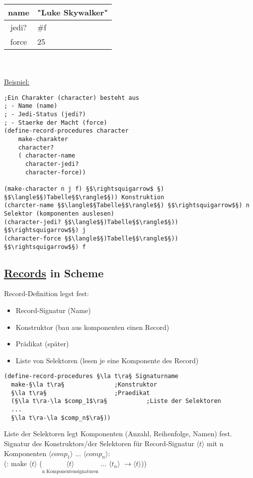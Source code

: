 \documentclass[a4paper,12pt]{article}
\newcommand{\la}{$\langle$}
\newcommand{\ra}{$\rangle$}
\begin{document}
\begin{tabular}{|c|l|}
\hline
name & "Luke Skywalker"\\
\hline
jedi? & \#f\\
\hline
force & 25\\
\hline
\end{tabular}
\\\\
\uline{Beispiel:}
\begin{lstlisting}[style=customc]
;Ein Charakter (character) besteht aus
; - Name (name)
; - Jedi-Status (jedi?)
; - Staerke der Macht (force)
(define-record-procedures character
	make-charakter
	character?
	( character-name
	  character-jedi?
	  character-force))
	  
(make-character n j f) §$\rightsquigarrow$ §) §$\langle$§)Tabelle§$\rangle$§)) Konstruktion
(charcter-name §$\langle$§Tabelle§$\rangle$§) §$\rightsquigarrow$§) n Selektor (komponenten auslesen)
(character-jedi? §$\langle$§)Tabelle§$\rangle$§)) §$\rightsquigarrow$§) j
(character-force §$\langle$§)Tabelle§$\rangle$§)) §$\rightsquigarrow$§) f
\end{lstlisting}
\subsection{\uline{Records} in Scheme}
Record-Definition legst fest:
\begin{itemize}
\item Record-Signatur (Name)
\item Konstruktor 		(bau aus komponenten einen Record)
\item Prädikat 			(später)
\item Liste von Selektoren (lesen je eine Komponente des Record)
\end{itemize}
\begin{lstlisting}[style=customc]
(define-record-procedures §\la t\ra§ Signaturname
  make-§\la t\ra§              ;Konstruktor
  §\la t\ra§                   ;Praedikat
  (§\la t\ra-\la $comp_1$\ra§           ;Liste der Selektoren
  ...
  §\la t\ra-\la $comp_n$\ra§))
	 \end{lstlisting}
Liste der Selektoren legt Komponenten (Anzahl, Reihenfolge, Namen) fest.
Signatur des Konstruktors/der Selektoren für Record-Signatur $\langle t \rangle$ mit n Komponenten $\langle comp_1\rangle$ ...  $\langle comp_n\rangle$:\\
(: make $\langle t \rangle$ ($\underset{\text{n Komponentensignaturen}}{\langle t \rangle}$ ... $\langle t_n \rangle$ $\rightarrow \langle t \rangle $))\\
\end{document}
